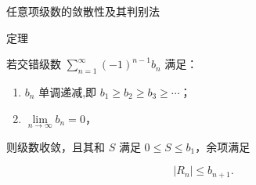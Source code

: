 \documentclass[aspectratio=169,10pt,fontset=fandol]{ctexbeamer}
\begin{document}
\begin{frame}[t,fragile]{任意项级数的敛散性及其判别法}
\normalsize
\begin{block}{定理}
{\normalsize


若交错级数 \(\sum_{n=1}^{\infty} (-1)^{n-1} b_n\) 满足：

\begin{enumerate}

\item \(b_n\) 单调递减,即 \(b_1 \geq b_2 \geq b_3 \geq \cdots\)；

\item \(\lim\limits_{n\to\infty} b_n = 0\)，

\end{enumerate}

则级数收敛，且其和 \(S\) 满足 \(\boxed{0\leq S\leq b_1}\)，余项满足

\[

\boxed{|R_n|\le b_{n+1}}.

\]


}
\end{block}
\end{frame}
\end{document}
